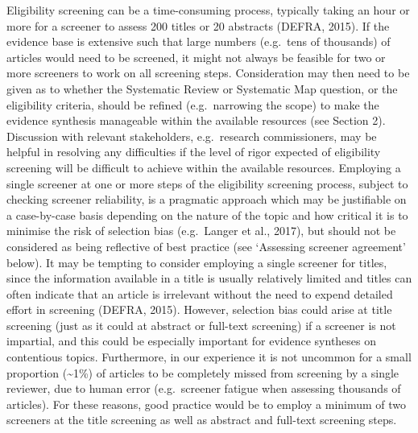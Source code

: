 \documentclass[
  letterpaper,
  DIV=11,
  numbers=noendperiod]{scrreprt}
\begin{document}
Eligibility screening can be a time-consuming process, typically taking
an hour or more for a screener to assess 200 titles or 20 abstracts
(DEFRA, 2015). If the evidence base is extensive such that large numbers
(e.g.~tens of thousands) of articles would need to be screened, it might
not always be feasible for two or more screeners to work on all
screening steps. Consideration may then need to be given as to whether
the Systematic Review or Systematic Map question, or the eligibility
criteria, should be refined (e.g.~narrowing the scope) to make the
evidence synthesis manageable within the available resources (see
Section 2). Discussion with relevant stakeholders, e.g.~research
commissioners, may be helpful in resolving any difficulties if the level
of rigor expected of eligibility screening will be difficult to achieve
within the available resources. Employing a single screener at one or
more steps of the eligibility screening process, subject to checking
screener reliability, is a pragmatic approach which may be justifiable
on a case-by-case basis depending on the nature of the topic and how
critical it is to minimise the risk of selection bias (e.g.~Langer et
al., 2017), but should not be considered as being reflective of best
practice (see `Assessing screener agreement' below). It may be tempting
to consider employing a single screener for titles, since the
information available in a title is usually relatively limited and
titles can often indicate that an article is irrelevant without the need
to expend detailed effort in screening (DEFRA, 2015). However, selection
bias could arise at title screening (just as it could at abstract or
full-text screening) if a screener is not impartial, and this could be
especially important for evidence syntheses on contentious topics.
Furthermore, in our experience it is not uncommon for a small proportion
(\textasciitilde1\%) of articles to be completely missed from screening
by a single reviewer, due to human error (e.g.~screener fatigue when
assessing thousands of articles). For these reasons, good practice would
be to employ a minimum of two screeners at the title screening as well
as abstract and full-text screening steps.
\end{document}
